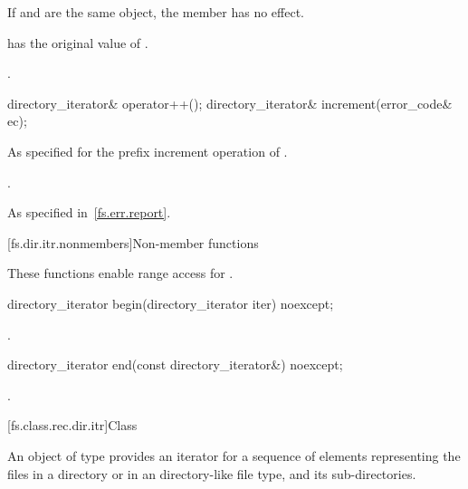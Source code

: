 \begin{itemdescr}
\pnum
\effects
If  and  are the same
  object, the member has no effect.

\pnum
\ensures
{} has the original value of .

\pnum
\returns
{}.
\end{itemdescr}

%
%
\begin{itemdecl}
directory_iterator& operator++();
directory_iterator& increment(error_code& ec);
\end{itemdecl}

\begin{itemdescr}
\pnum
\effects
As specified for the prefix increment operation of
.

\pnum
\returns
{}.

\pnum
\throws
As specified in~\ref{fs.err.report}.
\end{itemdescr}

[fs.dir.itr.nonmembers]{Non-member functions}

\pnum
These functions enable range access for .

%
\begin{itemdecl}
directory_iterator begin(directory_iterator iter) noexcept;
\end{itemdecl}

\begin{itemdescr}
\pnum
\returns
{}.
\end{itemdescr}

%
\begin{itemdecl}
directory_iterator end(const directory_iterator&) noexcept;
\end{itemdecl}

\begin{itemdescr}
\pnum
\returns
{}.
\end{itemdescr}

[fs.class.rec.dir.itr]{Class }

%
\pnum
An object of type  provides an iterator for
a sequence of  elements representing the files in a
directory or in an  directory-like file
type, and its sub-directories.

